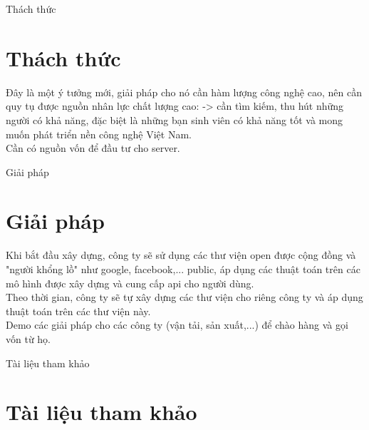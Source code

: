 \documentclass{beamer}
\begin{document}
\begin{frame}{Thách thức}
\section{Thách thức}
Đây là một ý tưởng mới, giải pháp cho nó cần hàm lượng công nghệ cao, nên cần quy tụ được nguồn nhân lực chất lượng cao: -> cần tìm kiếm, thu hút những người có khả năng, đặc biệt là những bạn sinh viên có khả năng tốt và mong muốn phát triển nền công nghệ Việt Nam.\\

Cần có nguồn vốn để đầu tư cho server.\\
\end{frame}
\begin{frame}{Giải pháp}
\section{Giải pháp}
Khi bắt đầu xây dựng, công ty sẽ sử dụng các thư viện open được cộng đồng và "người khổng lồ" như google, facebook,... public, áp dụng các thuật toán trên các mô hình được xây dựng và cung cấp api cho người dùng.\\

Theo thời gian, công ty sẽ tự xây dựng các thư viện cho riêng công ty và áp dụng thuật toán trên các thư viện này.\\

Demo các giải pháp cho các công ty (vận tải, sản xuất,...) để chào hàng và gọi vốn từ họ.



\end{frame}
\begin{frame}{Tài liệu tham khảo}
\section*{Tài liệu tham khảo}

\end{frame}
\end{document}
